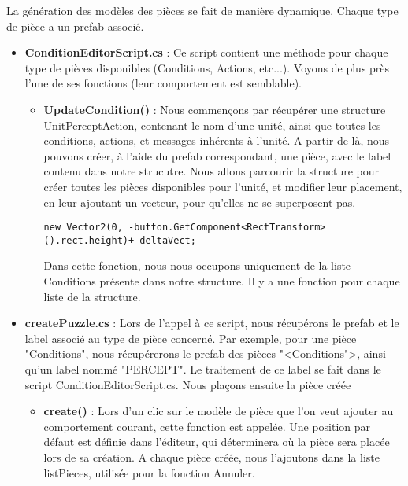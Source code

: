 \documentclass{article}
\begin{document}
La génération des modèles des pièces se fait de manière dynamique. Chaque type de pièce a un prefab associé. 
\begin{itemize}
\item\textbf{ConditionEditorScript.cs} : Ce script contient une méthode pour chaque type de pièces disponibles (Conditions, Actions, etc...). Voyons de plus près l'une de ses fonctions (leur comportement est semblable).
\begin{itemize}
\item\textbf{UpdateCondition()} : Nous commençons par récupérer une structure UnitPerceptAction, contenant le nom d'une unité, ainsi que toutes les conditions, actions, et messages inhérents à l'unité.\newline
A partir de là, nous pouvons créer, à l'aide du prefab correspondant, une pièce, avec le label contenu dans notre strucutre.
Nous allons parcourir la structure pour créer toutes les pièces disponibles pour l'unité, et modifier leur placement, en leur ajoutant un vecteur, pour qu'elles ne se superposent pas.
\begin{lstlisting}[frame=single]
new Vector2(0, -button.GetComponent<RectTransform>().rect.height)+ deltaVect;
\end{lstlisting}
Dans cette fonction, nous nous occupons uniquement de la liste Conditions présente dans notre structure. Il y a une fonction pour chaque liste de la structure.
\end{itemize}
\item\textbf{createPuzzle.cs} : Lors de l'appel à ce script, nous récupérons le prefab et le label associé au type de pièce concerné. Par exemple, pour une pièce "Conditions", nous récupérerons le prefab des pièces "<Conditions">, ainsi qu'un label nommé "PERCEPT". Le traitement de ce label se fait dans le script ConditionEditorScript.cs.\newline
Nous plaçons ensuite la pièce créée 

\begin{itemize}
\item\textbf{create()} : Lors d'un clic sur le modèle de pièce que l'on veut ajouter au comportement courant, cette fonction est appelée. Une position par défaut est définie dans l'éditeur, qui déterminera où la pièce sera placée lors de sa création.\newline
A chaque pièce créée, nous l'ajoutons dans la liste listPieces, utilisée pour la fonction Annuler.
\end{itemize}

\end{itemize}
\end{document}
